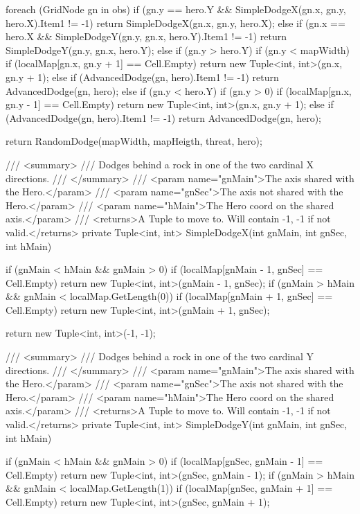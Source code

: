 \documentclass[11pt]{article}
\begin{document}
\begin{code}
{{{            foreach (GridNode gn in obs)
            {
                if (gn.y == hero.Y && SimpleDodgeX(gn.x, gn.y, hero.X).Item1 != -1)
                    return SimpleDodgeX(gn.x, gn.y, hero.X);
                else if (gn.x == hero.X && SimpleDodgeY(gn.y, gn.x, hero.Y).Item1 != -1)
                    return SimpleDodgeY(gn.y, gn.x, hero.Y);
                else if (gn.y > hero.Y)
                {
                    if (gn.y < mapWidth)
                        if (localMap[gn.x, gn.y + 1] == Cell.Empty)
                            return new Tuple<int, int>(gn.x, gn.y + 1);
                        else if (AdvancedDodge(gn, hero).Item1 != -1)
                            return AdvancedDodge(gn, hero);
                }
                else if (gn.y < hero.Y)
                {
                    if (gn.y > 0)
                        if (localMap[gn.x, gn.y - 1] == Cell.Empty)
                            return new Tuple<int, int>(gn.x, gn.y + 1);
                        else if (AdvancedDodge(gn, hero).Item1 != -1)
                            return AdvancedDodge(gn, hero);
                }
            }

            return RandomDodge(mapWidth, mapHeigth, threat, hero);
        }

        /// <summary>
        /// Dodges behind a rock in one of the two cardinal X directions.
        /// </summary>
        /// <param name="gnMain">The axis shared with the Hero.</param>
        /// <param name="gnSec">The axis not shared with the Hero.</param>
        /// <param name="hMain">The Hero coord on the shared axis.</param>
        /// <returns>A Tuple to move to. Will contain -1, -1 if not valid.</returns>
        private Tuple<int, int> SimpleDodgeX(int gnMain, int gnSec, int hMain)
        {
            if (gnMain < hMain && gnMain > 0)
                if (localMap[gnMain - 1, gnSec] == Cell.Empty)
                    return new Tuple<int, int>(gnMain - 1, gnSec);
            if (gnMain > hMain && gnMain < localMap.GetLength(0))
                if (localMap[gnMain + 1, gnSec] == Cell.Empty)
                    return new Tuple<int, int>(gnMain + 1, gnSec);

            return new Tuple<int, int>(-1, -1);
        }

        /// <summary>
        /// Dodges behind a rock in one of the two cardinal Y directions.
        /// </summary>
        /// <param name="gnMain">The axis shared with the Hero.</param>
        /// <param name="gnSec">The axis not shared with the Hero.</param>
        /// <param name="hMain">The Hero coord on the shared axis.</param>
        /// <returns>A Tuple to move to. Will contain -1, -1 if not valid.</returns>
        private Tuple<int, int> SimpleDodgeY(int gnMain, int gnSec, int hMain)
        {
            if (gnMain < hMain && gnMain > 0)
                if (localMap[gnSec, gnMain - 1] == Cell.Empty)
                    return new Tuple<int, int>(gnSec, gnMain - 1);
            if (gnMain > hMain && gnMain < localMap.GetLength(1))
                if (localMap[gnSec, gnMain + 1] == Cell.Empty)
                    return new Tuple<int, int>(gnSec, gnMain + 1);

}}}
\end{code}
\end{document}
